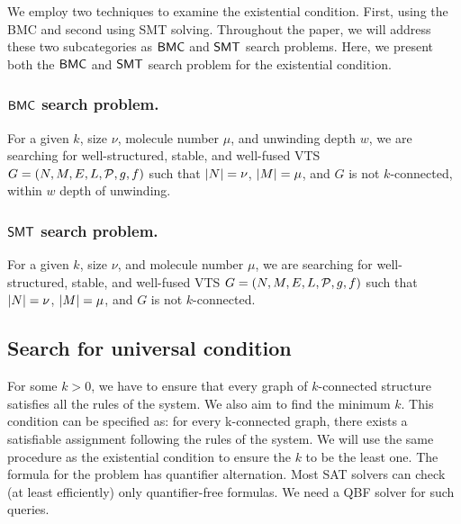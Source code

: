 We employ two techniques to examine the existential condition. 
%
First, using the BMC and second using SMT solving.
%
Throughout the paper, we will address these two subcategories as $\mathsf{BMC}$ and $\mathsf{SMT}$ search problems.
%
Here, we present both the $\mathsf{BMC}$ and $\mathsf{SMT}$ search problem for the existential condition.

\subsubsection{$\mathsf{BMC}$ search problem.}
For a given $k$, size $\nu$, molecule number $\mu$, and unwinding depth $w$,
we are searching for well-structured, stable, and well-fused VTS
$G = (N,M,E,L,\mathcal{P},g,f)$ such that
$|N| = \nu$, $|M| = \mu$, and $G$ is not $k$-connected, within $w$ depth of unwinding.    

\subsubsection{$\mathsf{SMT}$ search problem.}
For a given $k$, size $\nu$, and molecule number $\mu$,
we are searching for well-structured, stable, and well-fused VTS
$G = (N,M,E,L,\mathcal{P},g,f)$ such that
$|N| = \nu$, $|M| = \mu$, and
$G$ is not $k$-connected.    


\subsection{Search for universal condition}
%
For some $k>0$,
we have to ensure that every graph of $k$-connected structure satisfies all
the rules of the system.
%
We also aim to find the minimum $k$. 
%
This condition can be specified as: for every k-connected graph, there exists a satisfiable assignment following the rules of the system. 
%
%
We will use the same procedure as the existential condition to ensure the $k$ to be the least one.
%
The formula for the problem has quantifier alternation. 
%
Most SAT solvers can check (at least efficiently) only quantifier-free formulas.
%
We need a QBF solver for such queries.
%

